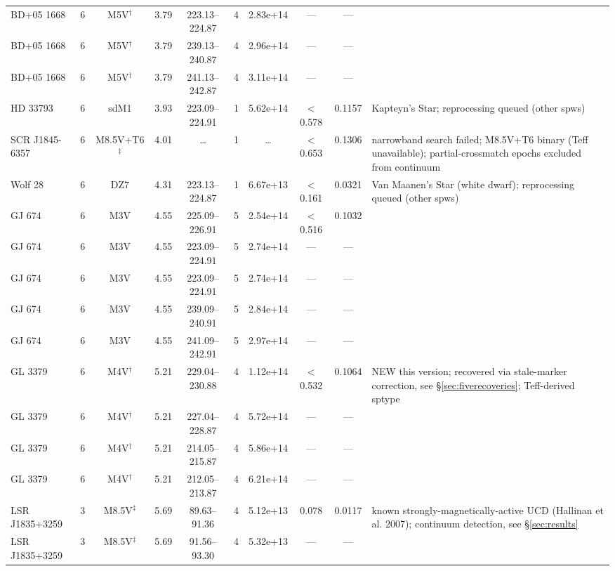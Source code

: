 \documentclass{openjournal}
\begin{document}
\begin{table}
\begin{tabularx}{\textwidth}{@{}l c c c c c c c c X@{}}
BD+05  1668 & 6 & M5V$^\dagger$ & 3.79 & 223.13--224.87 & 4 & 2.83e+14 & --- & --- &  \\
BD+05  1668 & 6 & M5V$^\dagger$ & 3.79 & 239.13--240.87 & 4 & 2.96e+14 & --- & --- &  \\
BD+05  1668 & 6 & M5V$^\dagger$ & 3.79 & 241.13--242.87 & 4 & 3.11e+14 & --- & --- &  \\
HD 33793 & 6 & sdM1 & 3.93 & 223.09--224.91 & 1 & 5.62e+14 & $<$0.578 & 0.1157 & Kapteyn's Star; reprocessing queued (other spws) \\
SCR J1845-6357 & 6 & M8.5V+T6$^\ddagger$ & 4.01 & \ldots & 1 & \ldots & $<$0.653 & 0.1306 & narrowband search failed; M8.5V+T6 binary (Teff unavailable); partial-crossmatch epochs excluded from continuum \\
Wolf   28 & 6 & DZ7 & 4.31 & 223.13--224.87 & 1 & 6.67e+13 & $<$0.161 & 0.0321 & Van Maanen's Star (white dwarf); reprocessing queued (other spws) \\
GJ 674 & 6 & M3V & 4.55 & 225.09--226.91 & 5 & 2.54e+14 & $<$0.516 & 0.1032 &  \\
GJ 674 & 6 & M3V & 4.55 & 223.09--224.91 & 5 & 2.74e+14 & --- & --- &  \\
GJ 674 & 6 & M3V & 4.55 & 223.09--224.91 & 5 & 2.74e+14 & --- & --- &  \\
GJ 674 & 6 & M3V & 4.55 & 239.09--240.91 & 5 & 2.84e+14 & --- & --- &  \\
GJ 674 & 6 & M3V & 4.55 & 241.09--242.91 & 5 & 2.97e+14 & --- & --- &  \\
GL 3379 & 6 & M4V$^\dagger$ & 5.21 & 229.04--230.88 & 4 & 1.12e+14 & $<$0.532 & 0.1064 & NEW this version; recovered via stale-marker correction, see \S\ref{sec:fiverecoveries}; Teff-derived sptype \\
GL 3379 & 6 & M4V$^\dagger$ & 5.21 & 227.04--228.87 & 4 & 5.72e+14 & --- & --- &  \\
GL 3379 & 6 & M4V$^\dagger$ & 5.21 & 214.05--215.87 & 4 & 5.86e+14 & --- & --- &  \\
GL 3379 & 6 & M4V$^\dagger$ & 5.21 & 212.05--213.87 & 4 & 6.21e+14 & --- & --- &  \\
LSR J1835+3259 & 3 & M8.5V$^\ddagger$ & 5.69 & 89.63--91.36 & 4 & 5.12e+13 & 0.078 & 0.0117 & known strongly-magnetically-active UCD (Hallinan et al. 2007); continuum detection, see \S\ref{sec:results} \\
LSR J1835+3259 & 3 & M8.5V$^\ddagger$ & 5.69 & 91.56--93.30 & 4 & 5.32e+13 & --- & --- &  \\
\hline
\end{tabularx}
\end{table}
\end{document}
